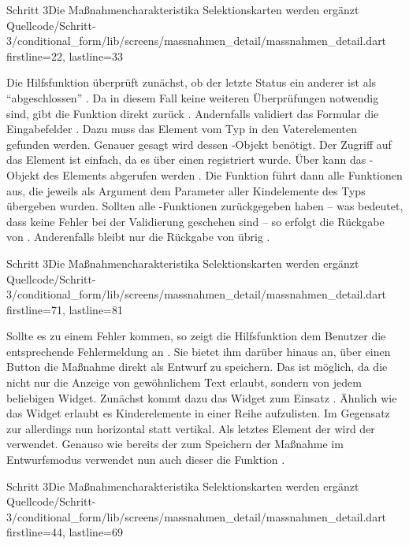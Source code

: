 \begin{alexlisting}{Schritt 3}{Die Maßnahmencharakteristika Selektionskarten werden ergänzt}
    {Quellcode/Schritt-3/conditional_form/lib/screens/massnahmen_detail/massnahmen_detail.dart}
    {firstline=22, lastline=33}
    \label{lst:Schritt3saveDraftAndGoBackToOverviewScreen}
\end{alexlisting}

Die Hilfsfunktion  überprüft zunächst, ob der letzte Status ein anderer ist als \enquote{abgeschlossen} . Da in diesem Fall keine weiteren Überprüfungen notwendig sind, gibt die Funktion direkt  zurück .
Andernfalls validiert das Formular die Eingabefelder . Dazu muss das Element vom Typ  in den Vaterelementen gefunden werden. Genauer gesagt wird dessen -Objekt benötigt. Der Zugriff auf das Element ist einfach, da es über einen  registriert wurde. Über  kann das -Objekt des Elements abgerufen werden . Die Funktion  führt dann alle Funktionen aus, die jeweils als Argument dem Parameter  aller Kindelemente des Typs  übergeben wurden. Sollten alle -Funktionen  zurückgegeben haben -- was bedeutet, dass keine Fehler bei der Validierung geschehen sind -- so erfolgt die Rückgabe von  . Anderenfalls bleibt nur die Rückgabe von  übrig .

\begin{alexlisting}{Schritt 3}{Die Maßnahmencharakteristika Selektionskarten werden ergänzt}
    {Quellcode/Schritt-3/conditional_form/lib/screens/massnahmen_detail/massnahmen_detail.dart}
    {firstline=71, lastline=81}
    \label{lst:Schritt3inputsAreValidOrNotMarkedFinal}
\end{alexlisting}

Sollte es zu einem Fehler kommen, so zeigt die Hilfsfunktion  dem Benutzer die entsprechende Fehlermeldung an \Lst{\ref{lst:Schritt3showValidationError}}. Sie bietet ihm darüber hinaus an, über einen Button die Maßnahme direkt als Entwurf zu speichern. Das ist möglich, da die   nicht nur die Anzeige von gewöhnlichem Text erlaubt, sondern von jedem beliebigen Widget. Zunächst kommt dazu das Widget  zum Einsatz . Ähnlich wie das Widget  erlaubt es Kinderelemente in einer Reihe aufzulisten. Im Gegensatz zur  allerdings nun horizontal statt vertikal. Als letztes Element der  wird der   verwendet. Genauso wie bereits der  zum Speichern der Maßnahme im Entwurfsmodus verwendet nun auch dieser  die Funktion  .

\begin{alexlisting}{Schritt 3}{Die Maßnahmencharakteristika Selektionskarten werden ergänzt}
    {Quellcode/Schritt-3/conditional_form/lib/screens/massnahmen_detail/massnahmen_detail.dart}
    {firstline=44, lastline=69}
    \label{lst:Schritt3showValidationError}
\end{alexlisting}

